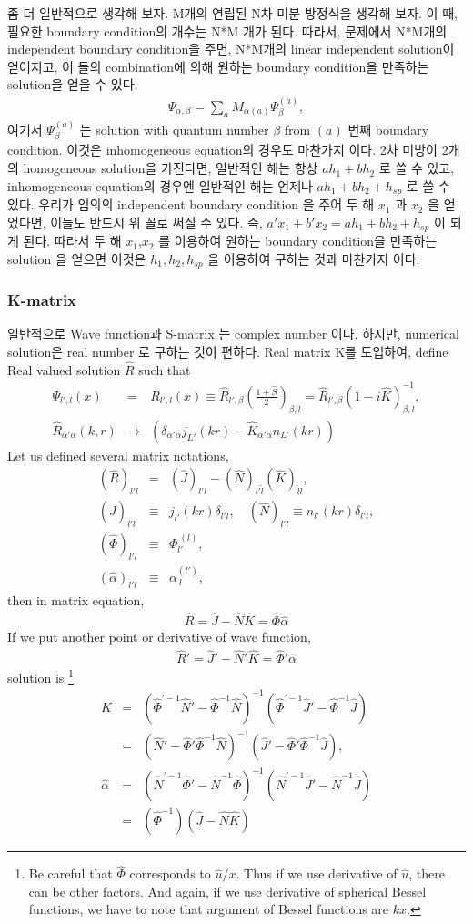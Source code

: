 \documentclass[10pt]{article}
\newcommand{\bea}{\begin{eqnarray}}
\newcommand{\eea}{\end{eqnarray}}
\newcommand{\no}{\nonumber \\}
\begin{document}
좀 더 일반적으로 생각해 보자. M개의 연립된 N차 미분 방정식을 생각해 보자. 이 때, 필요한 
boundary condition의 개수는 N*M 개가 된다. 따라서, 문제에서 N*M개의 independent boundary 
condition을 주면, N*M개의 linear independent solution이 얻어지고, 이 들의 combination에 의해
원하는 boundary condition을 만족하는 solution을 얻을 수 있다. 
\bea 
\Psi_{\alpha,\beta}=\sum_{a} M_{\alpha (a)} \Psi^{(a)}_{\beta} ,
\eea 
여기서 $\Psi^{(a)}_{\beta}$ 는 solution with quantum number $\beta $
from $(a)$ 번째 boundary condition. 
이것은 inhomogeneous equation의 경우도 마찬가지 이다. 
2차 미방이 2개의 homogeneous solution을 가진다면, 일반적인 해는 항상 
$a h_1+ b h_2$ 로 쓸 수 있고, inhomogeneous equation의 경우엔
일반적인 해는 언제나 $a h_1+ b h_2+ h_{sp}$ 로 쓸 수 있다. 
우리가 임의의 independent boundary condition 을 주어 두 해 
$x_1$ 과 $x_2$ 을 얻었다면, 이들도 반드시 위 꼴로 써질 수 있다.
즉, $a' x_1+ b' x_2=a h_1+ b h_2+ h_{sp}$ 이 되게 된다. 
따라서 두 해 $x_1$,$x_2$ 를 이용하여 원하는 boundary condition을 만족하는 
solution 을 얻으면 이것은 $h_1,h_2,h_{sp}$ 을 이용하여 구하는 것과 마찬가지 이다. 


\subsubsection{K-matrix}

일반적으로 Wave function과 
S-matrix 는 complex number 이다. 하지만, numerical solution은 
real number 로 구하는 것이 편하다. Real matrix K를 도입하여,
define Real valued solution $\hat{R}$ such that
\bea
\Psi_{l',l}(x)&=&R_{l',l}(x)\equiv\hat{R}_{l',\beta}(\frac{1+\hat{S}}{2})_{\beta,l}=\hat{R}_{l',\beta}(1-i\hat{K})^{-1}_{\beta,l},\no
\hat{R}_{\alpha'\alpha}(k, r)&\to&\left(\delta_{\alpha'\alpha}j_{L'}(kr)-\hat{K}_{\alpha'\alpha}n_{L'}(kr)\right)
\eea
Let us defined several matrix notations,
\bea
(\hat{R})_{l'l}&=&(\hat{J})_{l'l}-(\hat{N})_{l'\tilde{l}}
                                  (\hat{K})_{\tilde{l} l},\no
(\hat{J})_{l'l}&\equiv& j_{l'}(kr)\delta_{l'l},\quad
(\hat{N})_{l'l} \equiv n_{l'}(kr)\delta_{l'l},\no
(\hat{\Phi})_{l'l}&\equiv& \Phi_{l'}^{\ (l)},\no
(\hat{\alpha})_{l' l}&\equiv& \alpha^{(l')}_{\ l},
\eea
then in matrix equation,
\bea
\hat{R}=\hat{J}-\hat{N}\hat{K}=\hat{\Phi}\hat{\alpha}
\eea
If we put another point or derivative of wave function,
\bea
\hat{R}'=\hat{J}'-\hat{N}'\hat{K}=\hat{\Phi}'\hat{\alpha}
\eea
solution is
\footnote{
Be careful that $\hat{\Phi}$ corresponds to $\hat{u}/x$.
Thus if we use derivative of $\hat{u}$, there can be other factors.
And again, if we use derivative of spherical Bessel functions,
we have to note that argument of Bessel functions are $k x$.
}
\bea
\hat{K}&=&(\hat{\Phi}^{'-1}\hat{N}'-\hat{\Phi}^{-1}\hat{N})^{-1}
        (\hat{\Phi}^{'-1}\hat{J}'-\hat{\Phi}^{-1}\hat{J})\no  
       &=& (\hat{N}'-\hat{\Phi}' \hat{\Phi}^{-1}\hat{N})^{-1}
        (\hat{J}'- \hat{\Phi}' \hat{\Phi}^{-1}\hat{J}),\no
\hat{\alpha}&=&(\hat{N}^{'-1}\hat{\Phi}'-\hat{N}^{-1}\hat{\Phi})^{-1}
        (\hat{N}^{'-1}\hat{J}'-\hat{N}^{-1}\hat{J})\no
        &=& (\hat\Phi^{-1})(\hat{J}-\hat{N}\hat{K})
\eea
\end{document}
